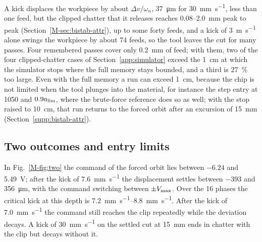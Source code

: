 A kick displaces the workpiece by about $\Delta v/\omega_n$, \SI{37}{\micro\metre} for \SI{30}{\milli\metre\per\second}, less than one feed, but the clipped chatter that it releases reaches 0.08--\SI{2.0}{\milli\metre} peak to peak (Section~\ref{M-sec:bistab-attr}), up to some forty feeds, and a kick of \SI{3}{\metre\per\second} alone swings the workpiece by about 74 feeds, so the tool leaves the cut for many passes. Four remembered passes cover only \SI{0.2}{\milli\metre} of feed; with them, two of the four clipped-chatter cases of Section~\ref{app:simulator} exceed the \SI{1}{\centi\metre} at which the simulator stops where the full memory stays bounded, and a third is \SI{27}{\percent} too large. Even with the full memory a run can exceed \SI{1}{\centi\metre}, because the chip is not limited when the tool plunges into the material, for instance the step entry at \SI{1050}{\rpm} and $0.9a_{\lim}$, where the brute-force reference does so as well; with the stop raised to \SI{10}{\centi\metre}, that run returns to the forced orbit after an excursion of \SI{15}{\milli\metre} (Section~\ref{supp:bistab-attr}).

\subsection{Two outcomes and entry limits}\label{supp:bistab-map}

In Fig.~\ref{M-fig:two} the command of the forced orbit lies between $-6.24$ and \SI{5.49}{\volt}; after the kick of \SI{7.6}{\milli\metre\per\second} the displacement settles between $-393$ and \SI{356}{\micro\metre}, with the command switching between $\pm V_{\max}$. Over the 16 phases the critical kick at this depth is \SIrange{7.2}{8.8}{\milli\metre\per\second}. After the kick of \SI{7.0}{\milli\metre\per\second} the command still reaches the clip repeatedly while the deviation decays. A kick of \SI{30}{\milli\metre\per\second} on the settled cut at \SI{15}{\milli\metre} ends in chatter with the clip but decays without it.

